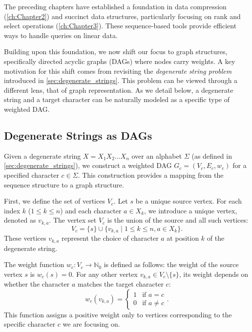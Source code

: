 The preceding chapters have established a foundation in data compression (\autoref{ch:Chapter2}) and succinct data structures, particularly focusing on \textsf{rank} and \textsf{select} operations (\autoref{ch:Chapter3}). These sequence-based tools provide efficient ways to handle queries on linear data.

Building upon this foundation, we now shift our focus to graph structures, specifically directed acyclic graphs (DAGs) where nodes carry weights. A key motivation for this shift comes from revisiting the \emph{degenerate string problem} introduced in \autoref{sec:degenerate_strings}. This problem can be viewed through a different lens, that of graph representation. As we detail below, a degenerate string and a target character can be naturally modeled as a specific type of weighted DAG.

\subsection*{Degenerate Strings as DAGs}
\label{subsec:dag_from_degenerate}

Given a degenerate string $X = X_1 X_2 \dots X_n$ over an alphabet $\Sigma$ (as defined in \autoref{sec:degenerate_strings}), we construct a weighted DAG $G_c = (V_c, E_c, w_c)$ for a specified character $c \in \Sigma$. This construction provides a mapping from the sequence structure to a graph structure.

First, we define the set of vertices $V_c$. Let $s$ be a unique source vertex. For each index $k$ ($1 \le k \le n$) and each character $a \in X_k$, we introduce a unique vertex, denoted as $v_{k,a}$. The vertex set $V_c$ is the union of the source and all such vertices:
\[ V_c = \{s\} \cup \{ v_{k,a} \mid 1 \le k \le n, a \in X_k \}. \]
These vertices $v_{k,a}$ represent the choice of character $a$ at position $k$ of the degenerate string.

The weight function $w_c: V_c \to \mathbb{N}_0$ is defined as follows: the weight of the source vertex $s$ is $w_c(s) = 0$. For any other vertex $v_{k,a} \in V_c \setminus \{s\}$, its weight depends on whether the character $a$ matches the target character $c$:
\[ w_c(v_{k,a}) = \begin{cases} 1 & \text{if } a = c \\ 0 & \text{if } a \neq c \end{cases}. \]
This function assigns a positive weight only to vertices corresponding to the specific character $c$ we are focusing on.

